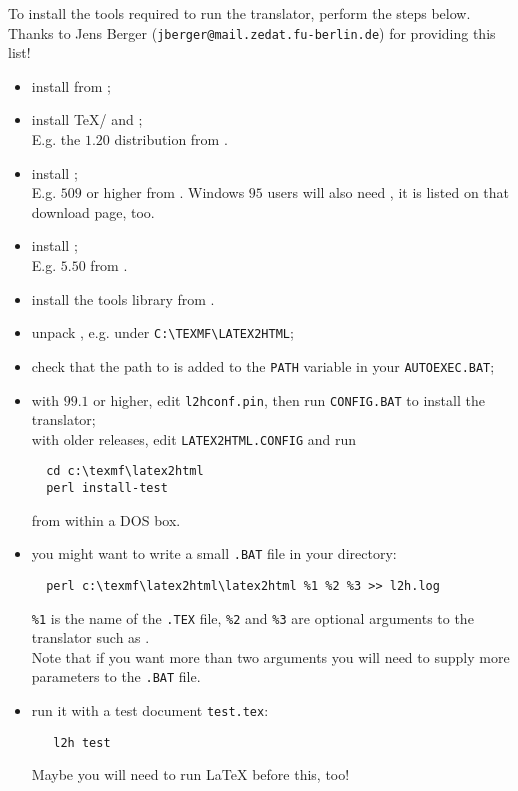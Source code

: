 To install the tools required to run the translator, perform the steps
below. Thanks to Jens Berger (\texttt{jberger@mail.zedat.fu-berlin.de})
for providing this list!
\begin{itemize}
\item install  from \WinZipURL;
\item install \TeX/\LaTeXe{} and ;\\
   E.g. the  $1.20$ distribution from \MikTeXURL.
\item install ;\\
   E.g.  $509$ or higher from \ActiveStateURL.
   Windows $95$ users will also need , it is listed on
   that download page, too.
\item install ;\\
    E.g.  $5.50$ from \GhostScriptURL.
\item install the  tools library from \NetpbmWinURL.
\item unpack \latextohtml{}, e.g. under \verb|C:\TEXMF\LATEX2HTML|;
\item check that the path to  is added to the
  \texttt{PATH} variable in your \texttt{AUTOEXEC.BAT};
\item with \latextohtml{} $99.1$ or higher, edit \texttt{l2hconf.pin},
  then run \texttt{CONFIG.BAT} to install the translator;\\
  with older releases, edit \texttt{LATEX2HTML.CONFIG} and run
  \begin{verbatim}
  cd c:\texmf\latex2html
  perl install-test
  \end{verbatim}
  from within a DOS box.
\item you might want to write a small \texttt{.BAT} file in your
  \latextohtml{} directory:
  \begin{verbatim}
  perl c:\texmf\latex2html\latex2html %1 %2 %3 >> l2h.log
  \end{verbatim}
  \texttt{\%1} is the name of the \texttt{.TEX} file,
  \texttt{\%2} and \texttt{\%3} are optional arguments to the
  translator such as .\\
  Note that if you want more than two arguments you will need
  to supply more parameters to the \texttt{.BAT} file.
\item run it with a test document \texttt{test.tex}:
  \begin{verbatim}
   l2h test
  \end{verbatim}
  Maybe you will need to run \LaTeX{} before this, too!
\end{itemize}


